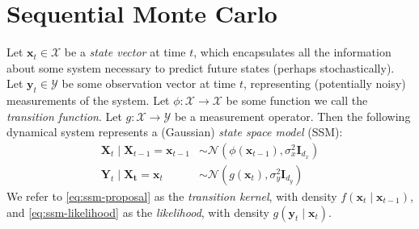 \section{Sequential Monte Carlo}

\begin{definition} \label{def:ssm}
    Let $\mathbf{x}_t \in \mathcal{X}$ be a \emph{state vector} at time $t$, which encapsulates all
    the information about some system necessary to predict future states (perhaps stochastically).
    Let $\mathbf{y}_t \in \mathcal{Y}$ be some observation vector at time $t$, representing
    (potentially noisy) measurements of the system. Let $\phi: \mathcal{X} \to \mathcal{X}$ be some
    function we call the \emph{transition function}. Let $g: \mathcal{X} \to \mathcal{Y}$ be a
    measurement operator. Then the following dynamical system represents a (Gaussian)
    \emph{state space model} (SSM):
    \begin{align}
        \mathbf{X}_t \mid \mathbf{X}_{t-1} = \mathbf{x}_{t-1} &\sim \mathcal{N}(\phi(\mathbf{x}_{t-1}), \sigma_x^2 \mathbf{I}_{d_x}) \label{eq:ssm-proposal} \\
        \mathbf{Y}_t \mid \mathbf{X_t} = \mathbf{x}_t &\sim \mathcal{N}(g(\mathbf{x}_t), \sigma_y^2 \mathbf{I}_{d_y}) \label{eq:ssm-likelihood}
    \end{align}
    We refer to \ref{eq:ssm-proposal} as the \emph{transition kernel}, with density
    $f(\mathbf{x}_t \mid \mathbf{x}_{t-1})$, and \ref{eq:ssm-likelihood} as the \emph{likelihood},
    with density $g(\mathbf{y}_t \mid \mathbf{x}_t)$.
\end{definition}

